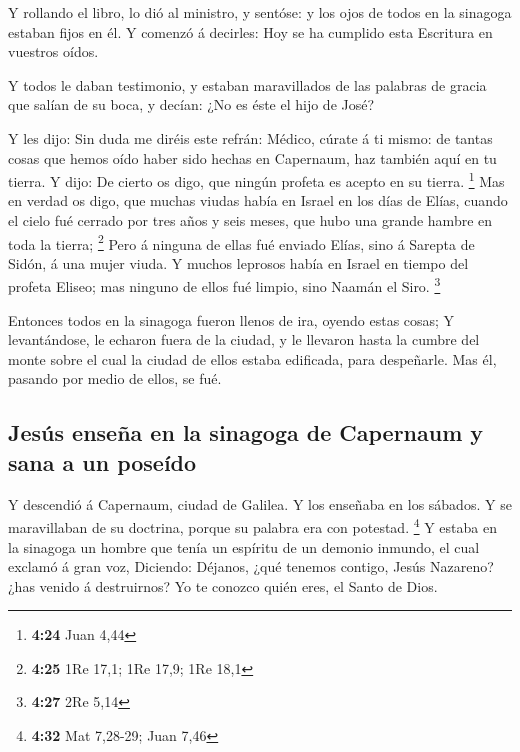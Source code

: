  Y rollando el libro, lo dió al ministro, y sentóse: y los
ojos de todos en la sinagoga estaban fijos en él.  Y
comenzó á decirles: Hoy se ha cumplido esta Escritura en vuestros oídos.

 Y todos le daban testimonio, y estaban maravillados de las
palabras de gracia que salían de su boca, y decían: ¿No es éste el hijo
de José?

 Y les dijo: Sin duda me diréis este refrán: Médico, cúrate
á ti mismo: de tantas cosas que hemos oído haber sido hechas en
Capernaum, haz también aquí en tu tierra.  Y dijo: De
cierto os digo, que ningún profeta es acepto en su tierra. \footnote{\textbf{4:24}
  Juan 4,44}  Mas en verdad os digo, que muchas viudas
había en Israel en los días de Elías, cuando el cielo fué cerrado por
tres años y seis meses, que hubo una grande hambre en toda la tierra;
\footnote{\textbf{4:25} 1Re 17,1; 1Re 17,9; 1Re 18,1}  Pero
á ninguna de ellas fué enviado Elías, sino á Sarepta de Sidón, á una
mujer viuda.  Y muchos leprosos había en Israel en tiempo
del profeta Eliseo; mas ninguno de ellos fué limpio, sino Naamán el
Siro. \footnote{\textbf{4:27} 2Re 5,14}

 Entonces todos en la sinagoga fueron llenos de ira, oyendo
estas cosas;  Y levantándose, le echaron fuera de la
ciudad, y le llevaron hasta la cumbre del monte sobre el cual la ciudad
de ellos estaba edificada, para despeñarle.  Mas él,
pasando por medio de ellos, se fué.

\hypertarget{jesuxfas-enseuxf1a-en-la-sinagoga-de-capernaum-y-sana-a-un-poseuxeddo}{%
\subsection{Jesús enseña en la sinagoga de Capernaum y sana a un
poseído}\label{jesuxfas-enseuxf1a-en-la-sinagoga-de-capernaum-y-sana-a-un-poseuxeddo}}

 Y descendió á Capernaum, ciudad de Galilea. Y los enseñaba
en los sábados.  Y se maravillaban de su doctrina, porque
su palabra era con potestad. \footnote{\textbf{4:32} Mat 7,28-29; Juan
  7,46}  Y estaba en la sinagoga un hombre que tenía un
espíritu de un demonio inmundo, el cual exclamó á gran voz,
 Diciendo: Déjanos, ¿qué tenemos contigo, Jesús Nazareno?
¿has venido á destruirnos? Yo te conozco quién eres, el Santo de Dios.

